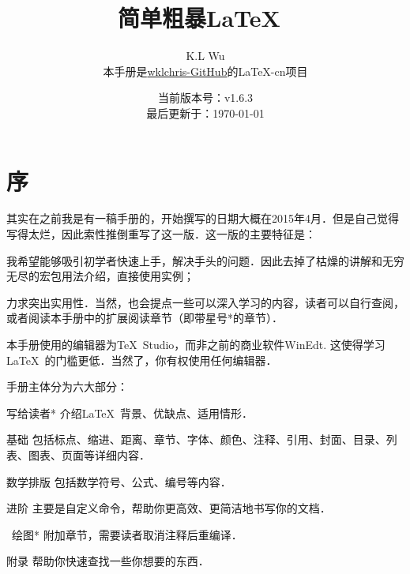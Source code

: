 

\title{简单粗暴\LaTeX\ }
\author{K.L Wu\\
  {\kaishu 本手册是\href{https://github.com/wklchris/Note-by-LaTeX}{wklchris-GitHub}的\LaTeX{}-cn项目}
}
\date{当前版本号：v1.6.3\\
  最后更新于：\today}



\maketitle

\setlength{\lineskiplimit}{0pt}
\tableofcontents
\setlength{\lineskiplimit}{3pt}

\chapter{序}

\dpar\dpar

其实在之前我是有一稿手册的，开始撰写的日期大概在2015年4月．但是自己觉得写得太烂，因此索性推倒重写了这一版．这一版的主要特征是：
\begin{feae}
  \item 我希望能够吸引初学者快速上手，解决手头的问题．因此去掉了枯燥的讲解和无穷无尽的宏包用法介绍，直接使用实例；
  \item 力求突出实用性．当然，也会提点一些可以深入学习的内容，读者可以自行查阅，或者阅读本手册中的扩展阅读章节（即带星号*的章节）．
  \item 本手册使用的编辑器为\TeX\ Studio，而非之前的商业软件WinEdt. 这使得学习\LaTeX\ 的门槛更低．当然了，你有权使用任何编辑器．
\end{feae}

手册主体分为六大部分\cite{LHY2013latex,lamport1994latex,frank2004latex,partl2016,Casteleyn2016tikz,tikzmanual}：
\begin{fead}
\item[写给读者*] 介绍\LaTeX\ 背景、优缺点、适用情形．
\item[基础] 包括标点、缩进、距离、章节、字体、颜色、注释、引用、封面、目录、列表、图表、页面等详细内容．
\item[数学排版] 包括数学符号、公式、编号等内容．
\item[进阶] 主要是自定义命令，帮助你更高效、更简洁地书写你的文档．
\item[\tikzz\  绘图*] 附加章节，需要读者取消注释后重编译．
\item[附录] 帮助你快速查找一些你想要的东西．
\end{fead}

